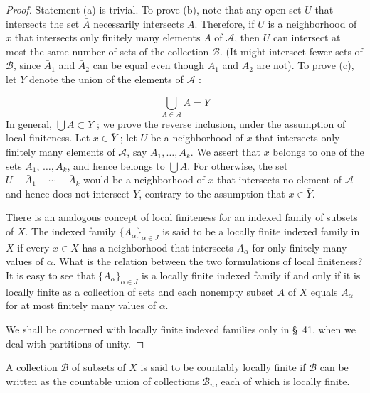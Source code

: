 \begin{proof}
 Statement (a) is trivial. To prove (b), note that any open set \(U\) that intersects the set \(\bar{A}\) necessarily intersects \(A\). Therefore, if \(U\) is a neighborhood of \(x\) that intersects only finitely many elements \(A\) of \(\mathcal{A}\), then \(U\) can intersect at most the same number of sets of the collection \(\mathcal{B}\). (It might intersect fewer sets of \(\mathcal{B}\), since \(\bar{A}_{1}\) and \(\bar{A}_{2}\) can be equal even though \(A_{1}\) and \(A_{2}\) are not).
To prove (c), let \(Y\) denote the union of the elements of \(\mathcal{A}\) :

\[
\mathop{\bigcup }\limits_{{A \in \mathcal{A}}}A = Y
\]
In general, \(\bigcup \bar{A} \subset \bar{Y}\) ; we prove the reverse inclusion, under the assumption of local finiteness. Let \(x \in \bar{Y}\) ; let \(U\) be a neighborhood of \(x\) that intersects only finitely many elements of \(\mathcal{A}\), say \(A_{1},\ldots ,A_{k}\). We assert that \(x\) belongs to one of the sets \(\bar{A}_{1}\), \(\ldots ,\bar{A}_{k}\), and hence belongs to \(\bigcup \bar{A}\). For otherwise, the set \(U - \bar{A}_{1} - \cdots - \bar{A}_{k}\) would be a neighborhood of \(x\) that intersects no element of \(\mathcal{A}\) and hence does not intersect \(Y\), contrary to the assumption that \(x \in \bar{Y}\).

There is an analogous concept of local finiteness for an indexed family of subsets of \(X\). The indexed family \({\{ A_{\alpha }\} }_{\alpha \in J}\) is said to be a locally finite indexed family in \(X\) if every \(x \in X\) has a neighborhood that intersects \(A_{\alpha }\) for only finitely many values of \(\alpha\). What is the relation between the two formulations of local finiteness? It is easy to see that \({\{ A_{\alpha }\} }_{\alpha \in J}\) is a locally finite indexed family if and only if it is locally finite as a collection of sets and each nonempty subset \(A\) of \(X\) equals \(A_{\alpha }\) for at most finitely many values of \(\alpha\).

We shall be concerned with locally finite indexed families only in \S\ 41, when we deal with partitions of unity.
\end{proof}
\begin{definition}
 A collection \(\mathcal{B}\) of subsets of \(X\) is said to be countably locally finite if \(\mathcal{B}\) can be written as the countable union of collections \(\mathcal{B}_{n}\), each of which is locally finite.
\end{definition}

